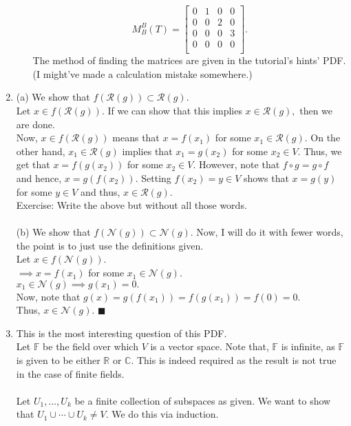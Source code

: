 \documentclass{article}
\begin{document}
\begin{enumerate}
\begin{enumerate}[label=(\roman*)]
		\[M_B^B(T) = \begin{bmatrix}
			0 & 1 & 0 & 0\\
			0 & 0 & 2 & 0\\
			0 & 0 & 0 & 3\\
			0 & 0 & 0 & 0\\
		\end{bmatrix}.\]
		The method of finding the matrices are given in the tutorial's hints' PDF. (I might've made a calculation mistake somewhere.)	
	\end{enumerate}
	\item (a) We show that $f(\mathcal{R}(g)) \subset \mathcal{R}(g).$\\
	Let $x \in f(\mathcal{R}(g)).$ If we can show that this implies $x \in \mathcal{R}(g),$ then we are done.\\
	Now, $x \in f(\mathcal{R}(g))$ means that $x = f(x_1)$ for some $x_1 \in \mathcal{R}(g).$ On the other hand, $x_1 \in \mathcal{R}(g)$ implies that $x_1 = g(x_2)$ for some $x_2 \in V.$ Thus, we get that $x = f(g(x_2))$ for some $x_2 \in V.$ However, note that $f \circ g = g \circ f$ and hence, $x = g(f(x_2)).$ Setting $f(x_2) = y \in V$ shows that $x = g(y)$ for some $y \in V$ and thus, $x \in \mathcal{R}(g).$\\
	Exercise: Write the above but without all those words.\\~\\
	(b) We show that $f(\mathcal{N}(g)) \subset \mathcal{N}(g).$ Now, I will do it with fewer words, the point is to just use the definitions given.\\
	Let $x \in f(\mathcal{N}(g)).$\\
	$\implies x = f(x_1)$ for some $x_1 \in \mathcal{N}(g).$\\
	$x_1 \in \mathcal{N}(g) \implies g(x_1) = 0.$\\
	Now, note that $g(x) = g(f(x_1)) = f(g(x_1)) = f(0) = 0.$\\
	Thus, $x \in \mathcal{N}(g).$ \hfill $\blacksquare$
	\item This is the most interesting question of this PDF.\\
	Let $\mathbb{F}$ be the field over which $V$ is a vector space. Note that, $\mathbb{F}$ is infinite, as $\mathbb{F}$ is given to be either $\mathbb{R}$ or $\mathbb{C}.$ This is indeed required as the result is not true in the case of finite fields.\\~\\
	Let $U_1, \ldots, U_k$ be a finite collection of subspaces as given. We want to show that $U_1 \cup \cdots \cup U_k \neq V.$ We do this via induction.\\~\\

\end{enumerate}
\end{document}
